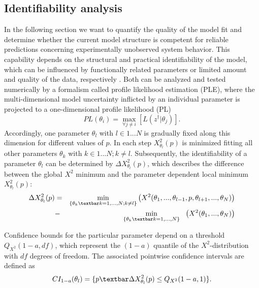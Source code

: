 \subsection{Identifiability analysis}
\label{sec:identifiabilityAnalysis}
In the following section we want to quantify the quality of the model fit and determine whether the current model structure is competent for reliable predictions concerning experimentally unobserved system behavior. This capability depends on the structural and practical identifiability of the model, which can be influenced by functionally related parameters or limited amount and quality of the data, respectively \cite{Cobelli1980,Swameye2003}. Both can be analyzed and tested numerically by a formalism called profile likelihood estimation (PLE)\cite{Venzon1988,Murphy2000,Raue2009}, where the multi-dimensional model uncertainty inflicted by an individual parameter is projected to a one-dimensional profile likelihood (PL)
\begin{equation}
PL(\theta_i) = \max_{\forall j \neq i} [L(z^\dag \lvert \theta_j)].
\label{eqn:PL} 
\end{equation}
Accordingly, one parameter $\theta_l$ with $l\in{1...N}$ is gradually fixed along this dimension for different values of $p$. In each step $X_{\theta_l}^2(p)$ is minimized fitting all other parameters $\theta_k$ with $k\in{1...N};k\neq l$. Subsequently, the identifiability of a parameter $\theta_l$ can be determined by $\Delta X_{\theta_l}^2(p)$, which describes the difference between the global $X^2$ minimum and the parameter dependent local minimum $X_{\theta_l}^2(p)$:
\begin{eqnarray}
	\Delta X_{\theta_l}^2(p) &=& \min_{\{\theta_k\textbar k=1,...,N;k\neq l\}} \left( X^2 (\theta_1,...,\theta_{l-1},p,\theta_{l+1},...,\theta_N )\right)\nonumber \\
	&-& \quad \! \min_{\{\theta_k\textbar k=1,...,N\}} \quad \!\! \left( X^2 (\theta_1,...,\theta_N )\right)
\end{eqnarray}  

Confidence bounds for the particular parameter depend on a threshold $Q_{X^2}(1-a,df)$, which represent the $(1-a)$ quantile of the $X^2$-distribution with $df$ degrees of freedom. The associated pointwise confidence intervals are defined as
\begin{equation}
CI_{1-a}(\theta_l)= \{p\textbar \Delta X_{\theta_l}^2(p)\leq Q_{X^2}(1-a,1)\}.
\label{eqn:confidenceIntervals}
\end{equation} 

